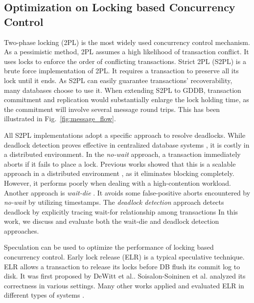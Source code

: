 \documentclass[conference]{IEEEtran}
\begin{document}
\subsection{Optimization on Locking based Concurrency Control}
Two-phase locking (2PL) is the most widely used concurrency control mechanism.
As a pessimistic method, 2PL assumes a high likelihood of transaction conflict.
It uses locks to enforce the order of conflicting transactions.
Strict 2PL (S2PL) is a brute force implementation of 2PL.
It requires a transaction to preserve all its lock until it ends.
As S2PL can easily guarantee transactions' recoverability, many databases choose to use it.
When extending S2PL to GDDB, transaction commitment and replication would substantially enlarge the lock holding time,
as the commitment will involve several message round trips. This has been illustrated in Fig.~\ref{fig:message_flow}.

All S2PL implementations adopt a specific approach to resolve deadlocks.
While deadlock detection proves effective in centralized database systems \cite{MySQL}\cite{PostgreSQL}, it is costly in a distributed environment.
In the \emph{no-wait}
\cite{EvaluationOfCC:journals/pvldb/HardingAPS17}
approach, a transaction immediately aborts if it fails to place a lock.
Previous works showed that this is a scalable approach in a distributed environment \cite{EvaluationCC1000Cores:journals/pvldb/YuBPDS14}\cite{EvaluationOfCC:journals/pvldb/HardingAPS17},
as it eliminates blocking completely.
However, it performs poorly when dealing with a high-contention workload.
Another approach is \emph{wait-die} \cite{LockNoWait:journals/csur/BernsteinG81}.
It avoids some false-positive aborts encountered by \emph{no-wait} by utilizing timestamps.
The \emph{deadlock detection} approach \cite{LockCC:conf/ds/GrayLPT76} detects deadlock by explicitly tracing wait-for relationship among transactions
In this work, we discuss and evaluate both the wait-die and deadlock detection approaches.

Speculation can be used to optimize the performance of locking based concurrency control.
Early lock release (ELR)
\cite{EfficientLocking:conf/vldb/KimuraGK12}
\cite{ELR:dewitt_implementation_1984}
\cite{PS2PL:conf/icdt/Soisalon-SoininenY95}
\cite{Aether:journals/pvldb/JohnsonPSAA10}
\cite{Actor-Oriented-DB:conf/icde/Bernstein18}
is a typical speculative technique.
ELR allows a transaction to release its locks before DB flush its commit log to disk.
It was first proposed by DeWitt et al.\cite{ELR:dewitt_implementation_1984}.
Soisalon-Soininen et al. \cite{PS2PL:conf/icdt/Soisalon-SoininenY95} analyzed its correctness in various settings.
Many other works applied and evaluated ELR in different types of systems
\cite{EfficientLocking:conf/vldb/KimuraGK12}
\cite{Aether:journals/pvldb/JohnsonPSAA10}.
\end{document}
